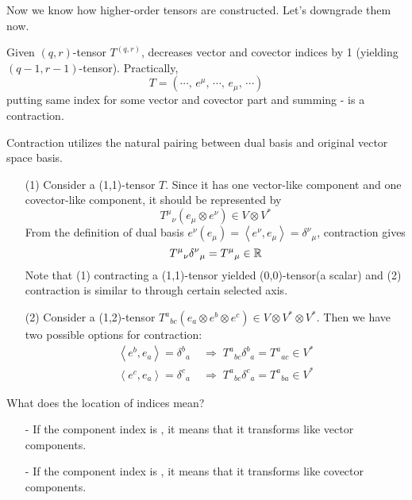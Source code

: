 \documentclass[a4paper, 10pt]{article}
\begin{document}
Now we know how higher-order tensors are constructed. Let's downgrade them now.
\begin{definition}[Contraction]
    Given $(q,r)$-tensor $T^{(q,r)}$,  decreases vector and covector indices by 1 (yielding $(q-1,r-1)$-tensor). Practically,
    \[ T = (\cdots,\, e^{\mu},\, \cdots,\, e_{\mu},\, \cdots) \]
    putting same index for some vector and covector part and summing - is a contraction.
\end{definition}
\begin{example}
    Contraction utilizes the natural pairing between dual basis and original vector space basis.
    \begin{itemize}
        \item[(1)] Consider a (1,1)-tensor $T$. Since it has one vector-like component and one covector-like component, it should be represented by
        \[ T^{\mu}{}_{\nu}(e_{\mu}\otimes e^{\nu}) \in V \otimes V^{\ast} \]
        From the definition of dual basis $e^{\nu}(e_{\mu}) = \left<e^{\nu},e_{\mu}\right> = \delta^{\nu}{}_{\mu}$, contraction gives
        \[ T^{\mu}{}_{\nu}\delta^{\nu}{}_{\mu} = T^{\mu}{}_{\mu} \in \mathbb{R} \]
        Note that (1) contracting a (1,1)-tensor yielded (0,0)-tensor(a scalar) and (2) contraction is similar to  through certain selected axis.
        \item[(2)] Consider a (1,2)-tensor $T^{a}{}_{bc}(e_{a}\otimes e^{b}\otimes e^{c}) \in V \otimes V^{\ast} \otimes V^{\ast}$. Then we have two possible options for contraction:
        \begin{align*}
            \left<e^{b},e_{a}\right> = \delta^{b}{}_{a} \;&\Longrightarrow\; T^{a}{}_{bc}\delta^{b}{}_{a} = T^{a}{}_{ac} \in V^{\ast} \\
            \left<e^{c},e_{a}\right> = \delta^{c}{}_{a} \;&\Longrightarrow\; T^{a}{}_{bc}\delta^{c}{}_{a} = T^{a}{}_{ba} \in V^{\ast}
        \end{align*}
    \end{itemize}
\end{example}
\newpage


What does the location of indices mean?
\begin{itemize}
    \item[-] If the component index is , it means that it transforms like vector components.
    \item[-] If the component index is , it means that it transforms like covector components.
\end{itemize}
\end{document}
